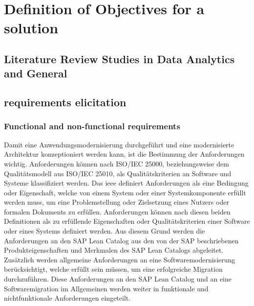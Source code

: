 \newpage\section{Definition of Objectives for a solution}

\subsection{Literature Review Studies in Data Analytics and General}

\subsection{requirements elicitation}

\subsubsection{Functional and non-functional requirements}

Damit eine Anwendungsmodernisierung durchgeführt und eine modernisierte Architektur konzeptioniert werden kann, ist die Bestimmung der Anforderungen wichtig.\autocite[Vgl.][Kapitel 3]{Seacord.2003} Anforderungen können nach ISO/IEC 25000, beziehungsweise dem Qualitätsmodell aus ISO/IEC 25010, als Qualitätskriterien an Software und Systeme klassifiziert werden.\autocite[Vgl.][]{ISOIEC25010.2011} Das \ac{ieee} definiert Anforderungen als eine Bedingung oder Eigenschaft, welche von einem System oder einer Systemkomponente erfüllt werden muss, um eine Problemstellung oder Zielsetzung eines Nutzers oder formalen Dokuments zu erfüllen.\autocite[Vgl.][S.62]{IEEE.1990} Anforderungen können nach diesen beiden Definitionen als zu erfüllende Eigenschaften oder Qualitätskriterien einer Software oder eines Systems definiert werden. Aus diesem Grund werden die Anforderungen an den SAP Lean Catalog aus den von der SAP beschriebenen Produkteigenschaften und Merkmalen des SAP Lean Catalogs abgeleitet. Zusätzlich werden allgemeine Anforderungen an eine Softwaremodernisierung berücksichtigt, welche erfüllt sein müssen, um eine erfolgreiche Migration durchzuführen. Diese Anforderungen an den SAP Lean Catalog und an eine Softwaremigration im Allgemeinen werden weiter in funktionale und nichtfunktionale Anforderungen eingeteilt. %

